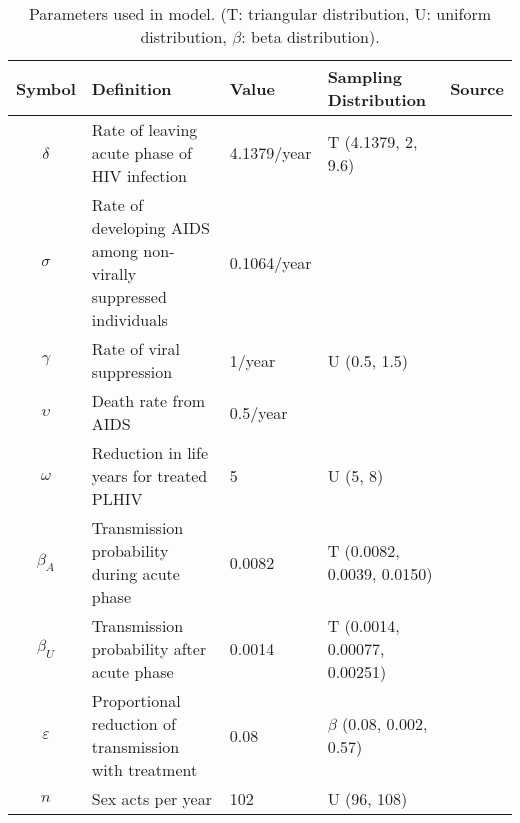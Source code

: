 \documentclass[11pt]{article}
\begin{document}
\begin{table}
  \begin{center}
    \begin{tabular}{cp{4cm}llc}
      \hline
      Symbol & Definition & Value & Sampling Distribution & Source \\ \hline
      $\delta$	& Rate of leaving acute phase of HIV infection & 4.1379/year & T (4.1379, 2, 9.6) & \cite{Hollingsworth2008-iy} \\
      $\sigma$	& Rate of developing AIDS among non-virally suppressed individuals
                          & 0.1064/year & & \cite{Morgan2002-cq} \\
      $\gamma$ & Rate of viral suppression & 1/year & U (0.5, 1.5) & \cite{Currie2009-yz} \\
      $\upsilon$	& Death rate from AIDS & 0.5/year &  & \cite{Morgan2002-cq} \\
      $\omega$	& Reduction in life years for treated PLHIV & 5 & U (5, 8) & \cite{Unaids2014-ue, Samji2013-kf}\\
      $\beta_{A}$	& Transmission probability during acute phase & 0.0082 & T (0.0082, 0.0039, 0.0150) & \cite{Skarbinski2015-ni,Wawer2005-us}\\
      $\beta_{U}$	& Transmission probability after acute phase & 0.0014 & T (0.0014, 0.00077, 0.00251) & \cite{Hughes2012-so}\\
      $\varepsilon$	& Proportional reduction of transmission with treatment & 0.08 & $\beta$ (0.08, 0.002, 0.57)& \cite{Donnell2010-xo}\\
      $n$			& Sex acts per year & 102 & U (96, 108) & \cite{Wawer2005-us,Abdool_Karim2010-cm}\\ \hline
    \end{tabular}
    \caption{Parameters used in model. (T: triangular distribution, U:
      uniform distribution, $\beta$: beta distribution).}
    \label{model_param}
  \end{center}
\end{table}
\end{document}
